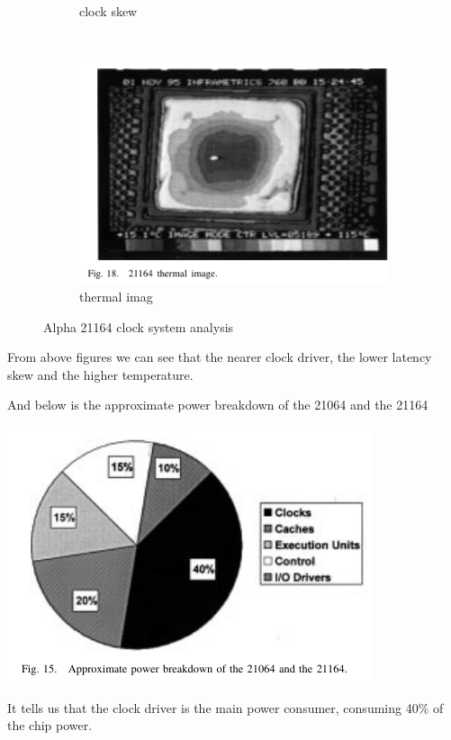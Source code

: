 \documentclass[11pt]{article}
\begin{document}
\begin{figure}[h]
\begin{subfigure}[b]{0.3\textwidth}
		\caption{clock skew}
	\end{subfigure}
	~ %
	\begin{subfigure}[b]{0.3\textwidth}
		\includegraphics[width=\textwidth]{21164_3.png}
		\caption{thermal imag}
	\end{subfigure}
	\caption{Alpha 21164 clock system analysis}
\end{figure}
From above figures we can see that the nearer clock driver, the lower latency skew and the higher temperature.

And below is the approximate power breakdown of the 21064 and the 21164
\begin{center}
	\includegraphics[scale=0.5]{power_consume.png}
\end{center}
It tells us that the clock driver is the main power consumer, consuming 40\% of the chip power.
\end{document}
